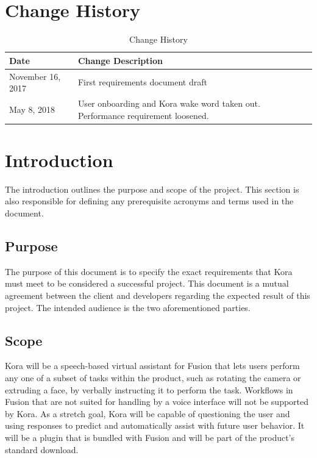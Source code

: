 \documentclass[onecolumn, draftclsnofoot,10pt, compsoc]{IEEEtran}
\def \botname{Kora\xspace}
\begin{document}
\section{Change History}
\begin{table}[H]
	\centering
	\caption{Change History}
	\label{my-label}
	\begin{tabular}{|l|l|}
		\hline
		\textbf{Date}     & \textbf{Change Description}   \\ \hline
		November 16, 2017 & {First requirements document draft} \\ \hline
		May 8, 2018 & {User onboarding and Kora wake word taken out. Performance requirement loosened.} \\ \hline
	\end{tabular}
\end{table}


\section{Introduction}
        The introduction outlines the purpose and scope of the project. 
        This section is also responsible for defining any prerequisite acronyms and terms used in the document. 
    \subsection{Purpose}
        The purpose of this document is to specify the exact requirements that \botname must meet to be considered a successful project. 
        This document is a mutual agreement between the client and developers regarding the expected result of this project.
        The intended audience is the two aforementioned parties.
    \subsection{Scope}
        \botname will be a speech-based virtual assistant for Fusion that lets users perform any one of a subset of tasks within the product, such as rotating the camera or extruding a face, by verbally instructing it to perform the task.
        Workflows in Fusion that are not suited for handling by a voice interface will not be supported by \botname.
        As a stretch goal, \botname will be capable of questioning the user and using responses to predict and automatically assist with future user behavior.
        It will be a plugin that is bundled with Fusion and will be part of the product's standard download. 
\end{document}
